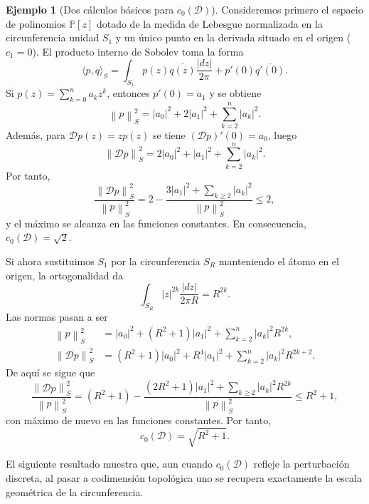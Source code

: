 \documentclass[12pt,a4paper]{article}
\theoremstyle{definition}
\newtheorem{example}{Ejemplo}
\theoremstyle{remark}
\newcommand{\Poly}{\mathbb{P}[z]}
\newcommand{\norm}[1]{\left\| #1 \right\|_S}
\newcommand{\abs}[1]{\left| #1 \right|}
\newcommand{\ip}[2]{\langle #1, #2 \rangle_S}
\newcommand{\D}{\mathcal{D}}
\begin{document}
\begin{example}[Dos cálculos básicos para $c_0(\mathcal{D})$]
	Consideremos primero el espacio de polinomios $\Poly$ dotado de la medida de Lebesgue normalizada en la circunferencia unidad $S_1$ y un único punto en la derivada situado en el origen ($c_1 = 0$). El producto interno de Sobolev toma la forma
	\begin{equation}
		\ip{p}{q} = \int_{S_1} p(z)\overline{q(z)} \frac{\abs{dz}}{2\pi} + p'(0)\overline{q'(0)}.
	\end{equation}
	Si $p(z) = \sum_{k=0}^n a_k z^k$, entonces $p'(0) = a_1$ y se obtiene
	\begin{equation} \label{eq:norma_in_0}
		\norm{p}^2 = \abs{a_0}^2 + 2\abs{a_1}^2 + \sum_{k=2}^n \abs{a_k}^2.
	\end{equation}
	Además, para $\D p(z) = z p(z)$ se tiene $(\D p)'(0) = a_0$, luego
	\begin{equation} \label{eq:norma_out_0}
		\norm{\D p}^2 = 2\abs{a_0}^2 + \abs{a_1}^2 + \sum_{k=2}^n \abs{a_k}^2.
	\end{equation}
	Por tanto,
	\begin{equation}
		\frac{\norm{\D p}^2}{\norm{p}^2} = 2 - \frac{3\abs{a_1}^2 + \sum_{k \ge 2} \abs{a_k}^2}{\norm{p}^2} \le 2,
	\end{equation}
	y el máximo se alcanza en las funciones constantes. En consecuencia, $c_0(\D) = \sqrt{2}$.

	Si ahora sustituimos $S_1$ por la circunferencia $S_R$ manteniendo el átomo en el origen, la ortogonalidad da
	\[\int_{S_R} |z|^{2k} \frac{|dz|}{2\pi R} = R^{2k}.\]
	Las normas pasan a ser
	\begin{align}
		\norm{p}^2    & = \abs{a_0}^2 + (R^2 + 1)\abs{a_1}^2 + \sum_{k=2}^n \abs{a_k}^2 R^{2k}, \label{eq:norma_in_0_R}       \\
		\norm{\D p}^2 & = (R^2 + 1)\abs{a_0}^2 + R^4\abs{a_1}^2 + \sum_{k=2}^n \abs{a_k}^2 R^{2k+2}. \label{eq:norma_out_0_R}
	\end{align}
	De aquí se sigue que
	\begin{equation}
		\frac{\norm{\D p}^2}{\norm{p}^2} = (R^2 + 1) - \frac{(2R^2 + 1)\abs{a_1}^2 + \sum_{k \ge 2} \abs{a_k}^2 R^{2k}}{\norm{p}^2} \le R^2 + 1,
	\end{equation}
	con máximo de nuevo en las funciones constantes. Por tanto,
	\[
		c_0(\D) = \sqrt{R^2 + 1}.
	\]
\end{example}

El siguiente resultado muestra que, aun cuando $c_0(\mathcal{D})$ refleje la perturbación discreta, al pasar a codimensión topológica uno se recupera exactamente la escala geométrica de la circunferencia.
\end{document}
